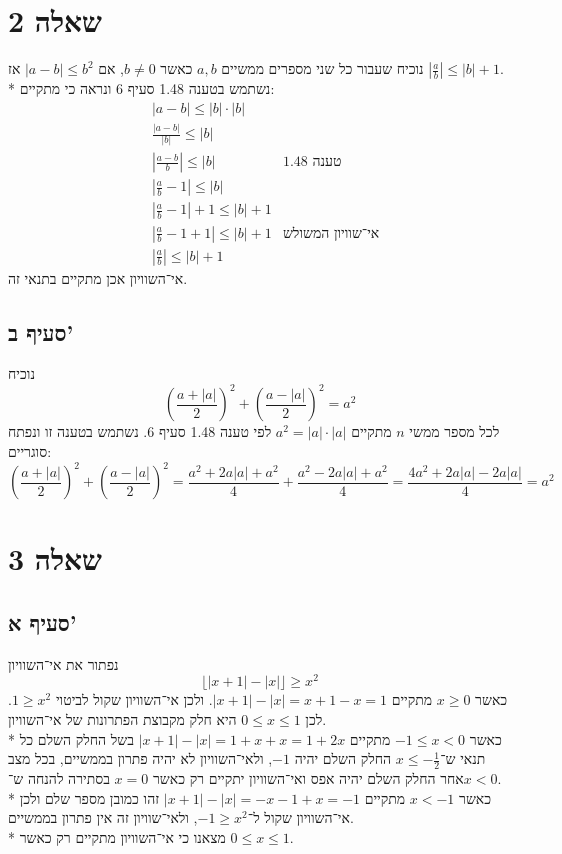 \documentclass[a4paper]{article}
\begin{document}
\section{שאלה 2}
נוכיח שעבור כל שני מספרים ממשיים $a, b$ כאשר $b \ne 0$,
אם $|a - b| \le b^2$ אז $|\frac{a}{b}| \le |b| + 1$. \\*
נשתמש בטענה 1.48 סעיף 6 ונראה כי מתקיים:
\begin{align*}
	& |a - b| \le |b| \cdot |b| \\
	& \frac{|a - b|}{|b|} \le |b| \\
	& \left|\frac{a - b}{b}\right| \le |b|
	& \text{טענה 1.48} \\
	& \left|\frac{a}{b} - 1\right| \le |b| \\
	& \left|\frac{a}{b} - 1\right| + 1 \le |b| + 1 \\
	& \left|\frac{a}{b} - 1 + 1\right| \le |b| + 1
	& \text{אי־שוויון המשולש} \\
	& \left|\frac{a}{b}\right| \le |b| + 1
\end{align*}
אי־השוויון אכן מתקיים בתנאי זה.

\subsection{סעיף ב'}
נוכיח
\[
	{\left( \frac{a + |a|}{2} \right)}^2
	+ {\left( \frac{a - |a|}{2} \right)}^2
	= a^2
\]
לכל מספר ממשי $n$ מתקיים $a^2 = |a| \cdot |a|$
לפי טענה 1.48 סעיף 6. נשתמש בטענה זו ונפתח סוגריים:
\[
	{\left( \frac{a + |a|}{2} \right)}^2
	+ {\left( \frac{a - |a|}{2} \right)}^2
	=
	\frac{a^2 + 2 a |a| + a^2}{4}
	+ \frac{a^2 - 2 a |a| + a^2}{4}
	=
	\frac{4 a^2 + 2 a |a| - 2 a |a|}{4}
	= a^2
\]

\section{שאלה 3}
\subsection{סעיף א'}
נפתור את אי־השוויון
\[
	\lfloor |x + 1| - |x| \rfloor \ge x^2
\]
כאשר $x \ge 0$ מתקיים $|x + 1| - |x| = x + 1 - x = 1$.
ולכן אי־השוויון שקול לביטוי $1 \ge x^2$.
לכן $0 \le x \le 1$ היא חלק מקבוצת הפתרונות של אי־השוויון. \\*
כאשר $-1 \le x < 0$ מתקיים $|x + 1| - |x| = 1 + x + x = 1 + 2x$
בשל החלק השלם כל תנאי ש־$x \le -\frac{1}{2}$ החלק השלם יהיה $-1$,
ולאי־השוויון לא יהיה פתרון בממשיים, בכל מצב אחר החלק השלם יהיה אפס
ואי־השוויון יתקיים רק כאשר $x = 0$ בסתירה להנחה ש־$x < 0$.
\\*
כאשר $x < -1$ מתקיים $|x + 1| - |x| = -x - 1 + x = -1$
זהו כמובן מספר שלם ולכן אי־השוויון שקול ל־$-1 \ge x^2$,
ולאי־שוויון זה אין פתרון בממשיים. \\*
מצאנו כי אי־השוויון מתקיים רק כאשר $0 \le x \le 1$.
\end{document}
